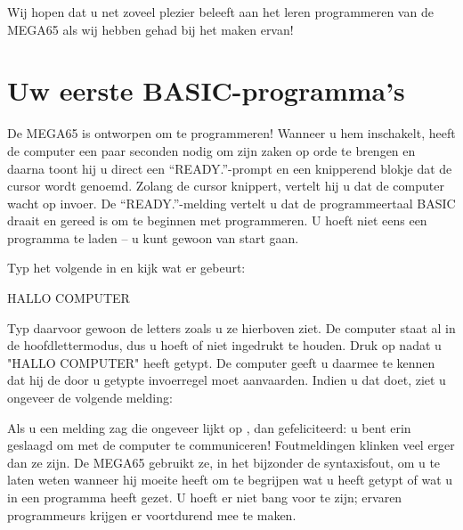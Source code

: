 Wij hopen dat u net zoveel plezier beleeft aan het leren programmeren van de MEGA65 als wij hebben gehad bij het maken ervan!

\section{Uw eerste BASIC-programma's}

De MEGA65 is ontworpen om te programmeren! Wanneer u hem inschakelt, heeft de computer een paar seconden nodig om zijn zaken op orde te brengen en daarna toont hij u direct een ``READY.''-prompt en een knipperend blokje dat de cursor wordt genoemd. Zolang de cursor knippert, vertelt hij u dat de computer wacht op invoer. De ``READY.''-melding vertelt u dat de programmeertaal BASIC draait en gereed is om te beginnen met programmeren. U hoeft niet eens een programma te laden -- u kunt gewoon van start gaan.

\needspace{4cm} %
Typ het volgende in en kijk wat er gebeurt:

\begin{screencode}
HALLO COMPUTER
\end{screencode}

\needspace{4cm} %

Typ daarvoor gewoon de letters zoals u ze hierboven ziet. De computer staat al in de hoofdlettermodus, dus u hoeft  of  niet ingedrukt te houden. Druk op  nadat u "HALLO COMPUTER" heeft getypt. De computer geeft u daarmee te kennen dat hij de door u getypte invoerregel moet aanvaarden. Indien u dat doet, ziet u ongeveer de volgende melding:


  Als u een melding zag die ongeveer lijkt op , dan gefeliciteerd: u bent erin geslaagd om met de computer te communiceren!  Foutmeldingen klinken veel erger dan ze zijn. De MEGA65 gebruikt ze, in het bijzonder de syntaxisfout, om u te laten weten wanneer hij moeite heeft om te begrijpen wat u heeft getypt of wat u in een programma heeft gezet. U hoeft er niet bang voor te zijn; ervaren programmeurs krijgen er voortdurend mee te maken.

